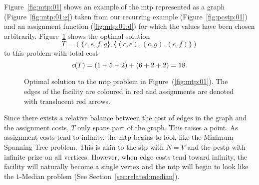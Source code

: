 Figure~\ref{fig:mtp:01} shows an example of the \gls{mtp} represented as a graph
(Figure~\ref{fig:mtp:01:g}) taken from our recurring example (Figure~\ref{fig:pcstp:01})
and an assignment function (\ref{fig:mtp:01:d}) for which the values have been
chosen arbitrarily.
Figure~\ref{fig:mtp:01:opt}
shows the optimal solution
\[T = ( \{ c, e, f, g \}, \{(c, e), (c, g), (e, f)\})\]
to this problem with total cost
\[c(T) = (1 + 5 + 2) + (6 + 2 + 2) = 18\mathnormal{.}\]
\begin{figure}[h!]
  \centering
    \caption{Optimal solution to the \gls{mtp} problem in Figure~(\ref{fig:mtp:01}).
      The edges of the facility are coloured in red and assignments are denoted with translucent red arrows.}\label{fig:mtp:01:opt}
  \end{figure}

  Since there exists a relative balance between the cost of edges in the graph and the assignment costs, $T$
  only spans part of the graph. This raises a point. As assignment costs tend to infinity, the \gls{mtp} begins to look
  like the Minimum Spanning Tree problem.
  This is akin to the \gls{stp} with $N = V$ and the \gls{pcstp} with infinite prize
  on all vertices. However, when edge costs tend toward infinity, the facility will naturally become a single vertex
  and the \gls{mtp} will begin to look like the $1$-Median problem (See Section~\ref{sec:related:median}).

